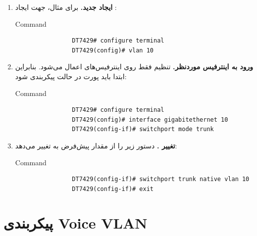 \documentclass[11pt,letterpaper]{report}
\begin{document}
	\begin{enumerate}[leftmargin=1.6em]

		\item \textbf{ایجاد  جدید.}
		برای مثال، جهت ایجاد :

		\begin{LTR}
			\begin{cliexample}{Command}
				\begin{verbatim}
				DT7429# configure terminal
				DT7429(config)# vlan 10
				\end{verbatim}
			\end{cliexample}
		\end{LTR}

		\item \textbf{ورود به اینترفیس  موردنظر.}
		تنظیم  فقط روی اینترفیس‌های  اعمال می‌شود.
		بنابراین ابتدا باید پورت در حالت  پیکربندی شود:

		\begin{LTR}
			\begin{cliexample}{Command}
				\begin{verbatim}
				DT7429# configure terminal
				DT7429(config)# interface gigabitethernet 10
				DT7429(config-if)# switchport mode trunk
				\end{verbatim}
			\end{cliexample}
		\end{LTR}

		\item \textbf{تغییر \lr{native VLAN}.}
		دستور زیر  را از مقدار پیش‌فرض \lr{VLAN 1} به
		 تغییر می‌دهد:

		\begin{LTR}
			\begin{cliexample}{Command}
				\begin{verbatim}
				DT7429(config-if)# switchport trunk native vlan 10
				DT7429(config-if)# exit
				\end{verbatim}
			\end{cliexample}
		\end{LTR}

	\end{enumerate}

	\section{پیکربندی Voice VLAN}
	\label{sec:voice-vlan}
\end{document}
